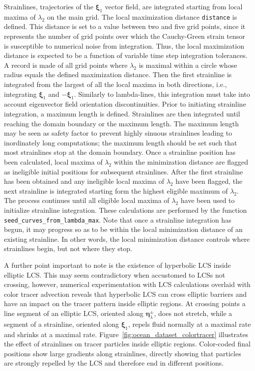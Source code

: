 \documentclass{article}
\begin{document}
Strainlines, trajectories of the $\boldsymbol \xi_1$ vector field, are integrated starting from local maxima of $\lambda_2$ on the main grid. The local maximization distance \lstinline!distance! is defined. This distance is set to a value between two and five grid points, since it represents the number of grid points over which the Cauchy-Green strain tensor is susceptible to numerical noise from integration. Thus, the local maximization distance is expected to be a function of variable time step integration tolerances. A record is made of all grid points where $\lambda_2$ is maximal within a circle whose radius equals the defined maximization distance. Then the first strainline is integrated from the largest of all the local maxima in both directions, i.e., integrating $\boldsymbol \xi_1$ and $-\boldsymbol \xi_1$. Similarly to lambda-lines, this integration must take into account eigenvector field orientation discontinuities. Prior to initiating strainline integration, a maximum length is defined. Strainlines are then integrated until reaching the domain boundary or the maximum length. The maximum length may be seen as safety factor to prevent highly sinuous strainlines leading to inordinately long computations; the maximum length should be set such that most strainlines stop at the domain boundary. Once a strainline position has been calculated, local maxima of $\lambda_2$ within the minimization distance are flagged as ineligible initial positions for subsequent strainlines. After the first strainline has been obtained and any ineligible local maxima of $\lambda_2$ have been flagged, the next strainline is integrated starting form the highest eligible maximum of $\lambda_2$. The process continues until all eligible local maxima of $\lambda_2$ have been used to initialize strainline integration. These calculations are performed by the function \lstinline!seed_curves_from_lambda_max!. Note that once a strainline integration has begun, it may progress so as to be within the local minimization distance of an existing strainline. In other words, the local minimization distance controls where strainlines begin, but not where they stop.

A further point important to note is the existence of hyperbolic LCS inside elliptic LCS. This may seem contradictory when accustomed to LCSs not crossing, however, numerical experimentation with LCS calculations overlaid with color tracer advection reveals that hyperbolic LCS can cross elliptic barriers and have an impact on the tracer pattern inside elliptic regions. At crossing points a line segment of an elliptic LCS, oriented along $\boldsymbol \eta_\lambda^{\pm}$, does not stretch, while a segment of a strainline, oriented along $\boldsymbol \xi_1$, repels fluid normally at a maximal rate and shrinks at a maximal rate. Figure~\ref{fig:ocean_dataset_colortracer} illustrates the effect of strainlines on tracer particles inside elliptic regions. Color-coded final positions show large gradients along strainlines, directly showing that particles are strongly repelled by the LCS and therefore end in different positions.
\end{document}
